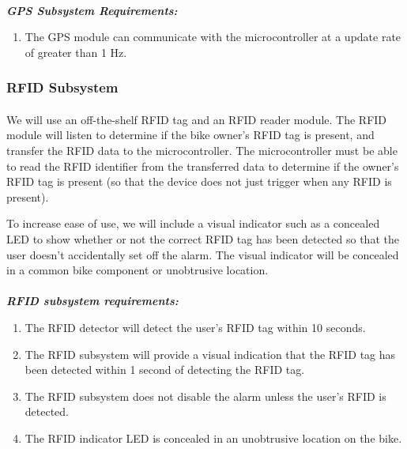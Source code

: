 \documentclass{article}
\begin{document}
\paragraph{} 


\textit{\textbf{GPS Subsystem Requirements:}}

\begin{enumerate}
	\item The GPS module can communicate with the microcontroller at a update rate of greater than 1 Hz. 
\end{enumerate}	


\subsubsection{RFID Subsystem}


\paragraph{} We will use an off-the-shelf RFID tag and an RFID reader module. The RFID module will listen to determine if the bike owner's RFID tag is present, and transfer the RFID data to the microcontroller. The microcontroller must be able to read the RFID identifier from the transferred data to determine if the owner's RFID tag is present (so that the device does not just trigger when any RFID is present). 

To increase ease of use, we will include a visual indicator such as a concealed LED to show whether or not the correct RFID tag has been detected so that the user doesn't accidentally set off the alarm. The visual indicator will be concealed in a common bike component or unobtrusive location. 

\paragraph{} 


\textit{\textbf{RFID subsystem requirements:}}
\begin{enumerate}
	\item The RFID detector will detect the user’s RFID tag within 10 seconds. 
	\item The RFID subsystem will provide a visual indication that the RFID tag has been detected within 1 second of detecting the RFID tag. 
	\item The RFID subsystem does not disable the alarm unless the user's RFID is detected.
	\item The RFID indicator LED is concealed in an unobtrusive location on the bike.
\end{enumerate}
\end{document}
